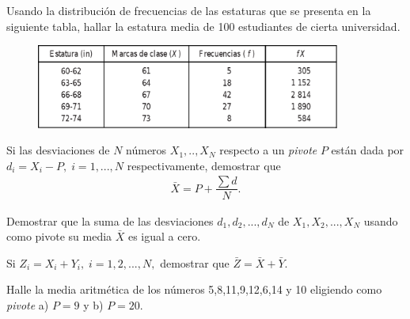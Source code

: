 \begin{problema}
	\label{problema:3.15}
	
	Usando la distribución de frecuencias de las estaturas que se presenta en la siguiente tabla, hallar la estatura media de 100 estudiantes de cierta universidad.
	\begin{figure}
		\centering
		\includegraphics[width=10cm,keepaspectratio=true]{./images/tab0301.png}
		\label{tab:0301}
	\end{figure}
\end{problema}




\begin{problema}
	\label{problema:3.18}
	Si las desviaciones de $N$ números $X_{1},..,X_{N}$ respecto a un \emph{pivote} $P$ están dada por $d_{i}=X_{i}-P, \; i=1,...,N$ respectivamente, demostrar que
	\begin{align}
		\bar{X}=P+\dfrac{\sum d}{N}.
	\end{align}
\end{problema}



\begin{problema}
	\label{problema:3.16}
	Demostrar que la suma de las desviaciones $d_{1},d_{2},...,d_{N}$ de $X_{1},X_{2},...,X_{N}$ usando como pivote su media $\bar{X}$ es igual a cero.
\end{problema}



\begin{problema}
	\label{problema:3.17}
	Si $Z_{i}=X_{i}+Y_{i}, \; i=1,2,...,N,$ demostrar que $\bar{Z}=\bar{X}+\bar{Y}.$
\end{problema}




\begin{problema}
	\label{problema:3.19}
	Halle la media aritmética de los números 5,8,11,9,12,6,14 y 10 eligiendo como \emph{pivote} a) $P=9$ y b) $P=20.$
\end{problema}




